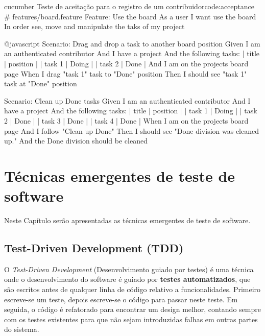 \begin{mycode}{cucumber}%
{Teste de aceitação para o registro de um contribuidor}{code:acceptance}
# features/board.feature
Feature: Use the board
  As a user
  I want use the board
  In order see, move and manipulate the taks of my project

  @javascript
  Scenario: Drag and drop a task to another board position
    Given I am an authenticated contributor
    And I have a project
    And the following tasks:
      | title  | position |
      | task 1 | Doing    |
      | task 2 | Done     |
    And I am on the projects board page
    When I drag "task 1" task to "Done" position
    Then I should see "task 1" task at "Done" position

  Scenario: Clean up Done tasks
    Given I am an authenticated contributor
    And I have a project
    And the following tasks:
      | title  | position |
      | task 1 | Doing    |
      | task 2 | Done     |
      | task 3 | Done     |
      | task 4 | Done     |
    When I am on the projects board page
    And I follow "Clean up Done"
    Then I should see "Done division was cleaned up."
    And the Done division should be cleaned
\end{mycode}



\section{Técnicas emergentes de teste de software}
\label{sec:tecnicas_emergentes_de_teste_de_software}

Neste Capítulo serão apresentadas as técnicas emergentes de teste de software.

\subsection{Test-Driven Development (TDD)}
\label{sub:tdd}

O \textit{Test-Driven Development} (Desenvolvimento guiado por testes) é uma técnica onde o desenvolvimento do software é guiado por \textbf{testes automatizados}, que são escritos antes de qualquer linha de código relativo a funcionalidades. Primeiro escreve-se um teste, depois escreve-se o código para passar neste teste. Em seguida, o código é refatorado para encontrar um design melhor, contando sempre com os testes existentes para que não sejam introduzidas falhas em outras partes do sistema.

